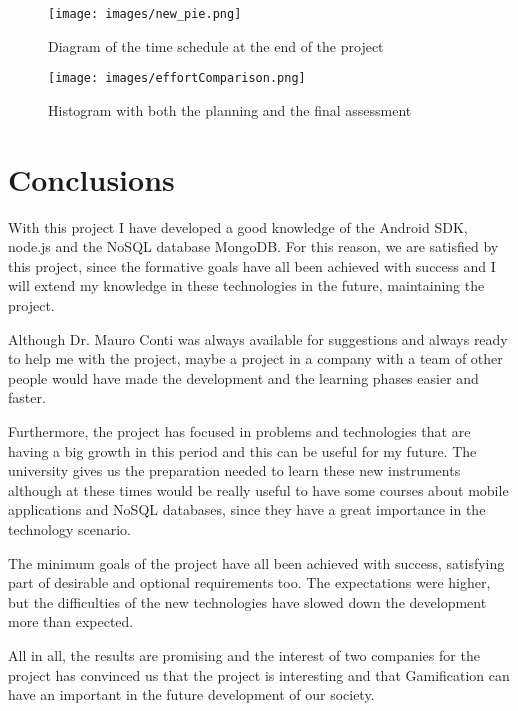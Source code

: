 \begin{figure}[H]
\centering %
\texttt{[image: images/new\_pie.png]}
\caption{Diagram of the time schedule at the end of the project}
\label{fig:new_pie}
\end{figure}

\begin{figure}[H]
\centering %
\texttt{[image: images/effortComparison.png]}
\caption{Histogram with both the planning and the final assessment}
\label{fig:histogramFinalAssessment}
\end{figure}

\section{Conclusions}

With this project I have developed a good knowledge of the Android SDK, node.js and the NoSQL database MongoDB. For this reason, we are satisfied by this project, since the formative goals have all been achieved with success and I will extend my knowledge in these technologies in the future, maintaining the project.

Although Dr. Mauro Conti was always available for suggestions and always ready to help me with the project, maybe a project in a company with a team of other people would have made the development and the learning phases easier and faster.

Furthermore, the project has focused in problems and technologies that are having a big growth in this period and this can be useful for my future. The university gives us the preparation needed to learn these new instruments although at these times would be really useful to have some courses about mobile applications and NoSQL databases, since they have a great importance in the technology scenario.

The minimum goals of the project have all been achieved with success, satisfying part of desirable and optional requirements too. The expectations were higher, but the difficulties of the new technologies have slowed down the development more than expected.

All in all, the results are promising and the interest of two companies for the project has convinced us that the project is interesting and that Gamification can have an important in the future development of our society.

\newpage
\thispagestyle{empty}
\mbox{}
\newpage

